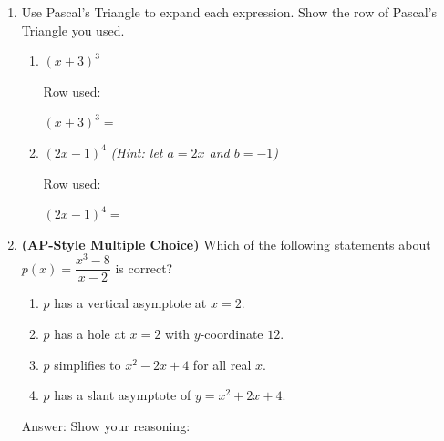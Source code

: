 \documentclass[10pt]{article}
\begin{document}
\begin{enumerate}[itemsep=18pt]
\begin{enumerate}[label=(\alph*), itemsep=8pt]
              \vspace{0.06in}
              $R(x) = $ \blank{8cm}

        \item State the equation of the slant asymptote. Explain in one sentence why this is
              the slant asymptote.

              \vspace{0.06in}
              Slant asymptote: $y = $ \blank{3cm}

              \writeline

        \item What is the remainder when $x^2+x-6$ is divided by $x-1$? What does this tell
              you about $R(1)$?

              \vspace{0.06in}
              Remainder: \blank{2cm} \quad $R(1) = $ \blank{2cm}
      \end{enumerate}

\item Use Pascal's Triangle to expand each expression. Show the row of Pascal's Triangle you used.

      \begin{enumerate}[label=(\alph*), itemsep=10pt]
        \item $(x + 3)^3$

              \vspace{0.06in}
              Row used: \blank{5cm}

              $(x+3)^3 = $ \blank{7cm}

        \item $(2x - 1)^4$ \quad \textit{(Hint: let $a = 2x$ and $b = -1$)}

              \vspace{0.06in}
              Row used: \blank{5cm}

              $(2x-1)^4 = $ \blank{9cm}
      \end{enumerate}

\item \textbf{(AP-Style Multiple Choice)} Which of the following statements about
      $\displaystyle p(x) = \dfrac{x^3 - 8}{x - 2}$ is correct?

      \medskip
      \begin{enumerate}[label=(\Alph*), itemsep=4pt]
        \item $p$ has a vertical asymptote at $x = 2$.
        \item $p$ has a hole at $x = 2$ with $y$-coordinate $12$.
        \item $p$ simplifies to $x^2 - 2x + 4$ for all real $x$.
        \item $p$ has a slant asymptote of $y = x^2 + 2x + 4$.
      \end{enumerate}

      \vspace{0.06in}
      Answer: \blank{1.5cm} \quad Show your reasoning:

      \vspace{0.06in}

\end{enumerate}
\end{document}
